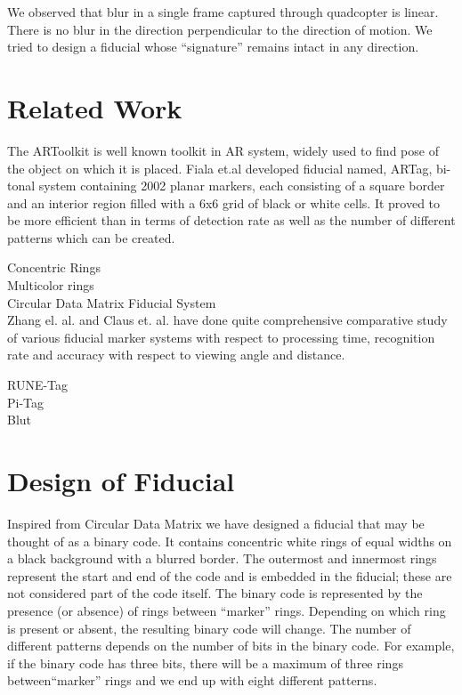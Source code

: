 \documentclass[runningheads]{llncs}
\begin{document}
We observed that blur in a single frame captured through quadcopter is linear.
There is no blur in the direction perpendicular to the direction of motion. We
tried to design a fiducial whose ``signature'' remains intact in any direction.

 
\section{Related Work}
The ARToolkit \cite{ARToolkit02} \cite{kato-artoolkit} is well known toolkit in
AR system, widely used to find pose of the object on which it is placed.
Fiala et.al \cite{Fiala05} developed fiducial named, ARTag, bi-tonal system
containing 2002 planar markers, each consisting of a square border and an
interior region filled with a 6x6 grid of black or white cells. It proved to be
more efficient than \cite{ARToolkit02} in terms of detection rate as well as the
number of different patterns which can be created.  

Concentric Rings\cite{NaimarkF02} \\
Multicolor rings \cite{Cho:2001} \cite{Cho97fastcolor} \\
Circular Data Matrix Fiducial System \cite{NaimarkF02} \\

Zhang el. al.\cite{Zhang:2002} and Claus et. al. \cite{ClausF04} have done
quite comprehensive comparative study of various fiducial marker systems with
respect to processing time, recognition rate and accuracy with
respect to viewing angle and distance.

RUNE-Tag \cite{runetag11} \\
Pi-Tag \cite{Pitag13} \\
Blut \cite{Wu:2011}


\section{Design of Fiducial}
Inspired from Circular Data Matrix\cite{NaimarkF02} we have designed a fiducial
that may be thought of as a binary code.  It contains concentric white rings of
equal widths on a black background with a blurred border. The outermost and
innermost rings represent the start and end of the code and is embedded in the
fiducial; these are not considered part of the code itself. The binary code is
represented by the presence (or absence) of rings between ``marker'' rings.
Depending on which ring is present or absent, the resulting binary code will
change. The number of different patterns depends on the number of bits in the
binary code. For example, if the binary code has three bits, there will be a
maximum of three rings between``marker'' rings and we end up with eight
different patterns.
\end{document}
